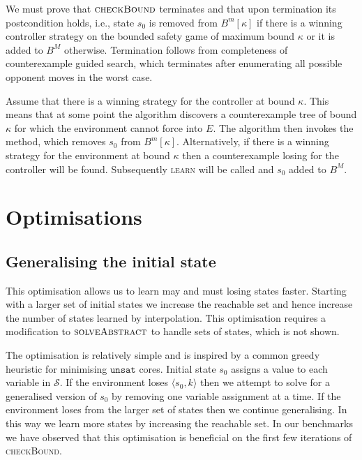 We must prove that $\textsc{checkBound}$ terminates and that upon termination
its postcondition holds, i.e., state $s_0$ is removed from $B^m[\kappa]$ if there
is a winning controller strategy on the bounded safety game of maximum bound
$\kappa$ or it is added to $B^M$ otherwise. Termination follows from
completeness of counterexample guided search, which terminates after
enumerating all possible opponent moves in the worst case.

Assume that there is a winning strategy for the controller at bound $\kappa$.
This means that at some point the algorithm discovers a counterexample tree of
bound $\kappa$ for which the environment cannot force into $E$. The algorithm
then invokes the \textsc{} method, which removes $s_0$ from
$B^m[\kappa]$.  Alternatively, if there is a winning strategy for the
environment at bound $\kappa$ then a counterexample losing for the controller
will be found.  Subsequently \textsc{learn} will be called and $s_0$ added to
$B^M$.

\section{Optimisations}

\subsection{Generalising the initial state}

This optimisation allows us to learn may and must losing states faster.
Starting with a larger set of initial states we increase the reachable set and
hence increase the number of states learned by interpolation. This optimisation
requires a modification to $\textsc{solveAbstract}$ to handle sets of states,
which is not shown.

The optimisation is relatively simple and is inspired by a common greedy
heuristic for minimising $\texttt{unsat}$ cores. Initial state $s_0$ assigns a value to
each variable in $\mathcal{S}$. If the environment loses $\langle s_0, k
\rangle$ then we attempt to solve for a generalised version of $s_0$ by removing
one variable assignment at a time. If the environment loses from the larger set of
states then we continue generalising. In this way we learn more
states by increasing the reachable set. In our benchmarks we have observed that
this optimisation is beneficial on the first few iterations of
\textsc{checkBound}.

